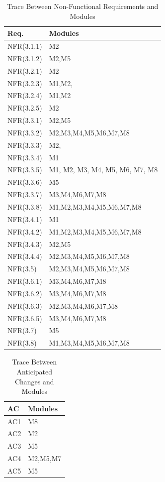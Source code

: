 \documentclass[12pt, titlepage]{article}
\begin{document}
\begin{table}[H]
	\centering
	\begin{tabular}{p{} p{}}
		\toprule
		\textbf{Req.} & \textbf{Modules}\\
		\midrule
		NFR(3.1.1) & M2\\
		NFR(3.1.2) & M2,M5\\
		NFR(3.2.1) & M2\\
		NFR(3.2.3) & M1,M2,\\
		NFR(3.2.4) & M1,M2\\
		NFR(3.2.5) & M2\\
		NFR(3.3.1) & M2,M5\\
		NFR(3.3.2) & M2,M3,M4,M5,M6,M7,M8\\
		NFR(3.3.3) & M2,\\
		NFR(3.3.4) & M1\\
		NFR(3.3.5) & M1, M2, M3, M4, M5, M6, M7, M8\\
		NFR(3.3.6) & M5\\
		NFR(3.3.7) & M3,M4,M6,M7,M8\\
		NFR(3.3.8) & M1,M2,M3,M4,M5,M6,M7,M8\\
		NFR(3.4.1) & M1\\
		NFR(3.4.2) & M1,M2,M3,M4,M5,M6,M7,M8\\
		NFR(3.4.3) & M2,M5\\
		NFR(3.4.4) & M2,M3,M4,M5,M6,M7,M8\\
		NFR(3.5) & M2,M3,M4,M5,M6,M7,M8\\
		NFR(3.6.1) & M3,M4,M6,M7,M8\\
		NFR(3.6.2) & M3,M4,M6,M7,M8\\
		NFR(3.6.3) & M2,M3,M4,M6,M7,M8\\
		NFR(3.6.5) & M3,M4,M6,M7,M8\\
		NFR(3.7) & M5\\
		NFR(3.8) & M1,M3,M4,M5,M6,M7,M8\\
		\bottomrule
	\end{tabular}
	\caption{Trace Between Non-Functional Requirements and Modules}
	\label{TblNRT}
\end{table}


\begin{table}[H]
\centering
\begin{tabular}{p{} p{}}
\toprule
\textbf{AC} & \textbf{Modules}\\
\midrule
AC1 & M8\\
AC2 & M2\\
AC3 & M5\\
AC4 & M2,M5,M7\\
AC5 & M5\\

\bottomrule
\end{tabular}
\caption{Trace Between Anticipated Changes and Modules}
\label{TblACT}
\end{table}
\end{document}
